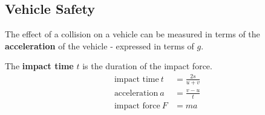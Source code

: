 \subsection{Vehicle Safety}

The effect of a collision on a vehicle can be measured in terms of the \textbf{acceleration} of the vehicle - expressed in terms of $g$.

The \textbf{impact time} $t$ is the duration of the impact force.
\begin{align*}
    \text{impact time}\ t&=\frac{2s}{u+v}\\
    \text{acceleration}\ a&=\frac{v-u}{t}\\
    \text{impact force}\ F&=ma
\end{align*}
